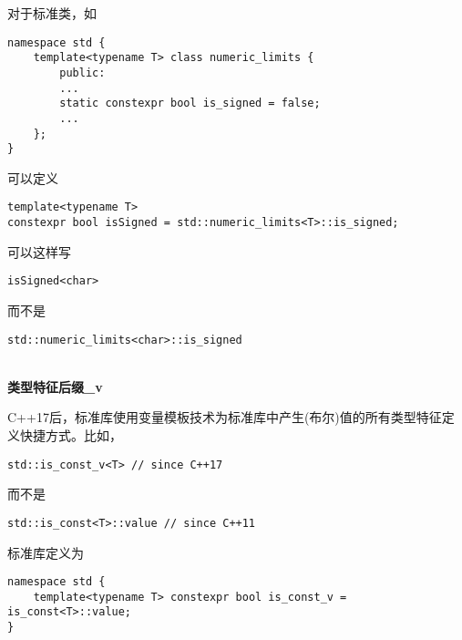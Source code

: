 对于标准类，如

\begin{lstlisting}[style=styleCXX]
namespace std {
	template<typename T> class numeric_limits {
		public:
		...
		static constexpr bool is_signed = false;
		...
	};
}
\end{lstlisting}

可以定义

\begin{lstlisting}[style=styleCXX]
template<typename T>
constexpr bool isSigned = std::numeric_limits<T>::is_signed;
\end{lstlisting}

可以这样写

\begin{lstlisting}[style=styleCXX]
isSigned<char>
\end{lstlisting}

而不是

\begin{lstlisting}[style=styleCXX]
std::numeric_limits<char>::is_signed
\end{lstlisting}

\hspace*{\fill} \\ %
\noindent
\textbf{类型特征后缀\_v}

C++17后，标准库使用变量模板技术为标准库中产生(布尔)值的所有类型特征定义快捷方式。比如，

\begin{lstlisting}[style=styleCXX]
std::is_const_v<T> // since C++17
\end{lstlisting}

而不是

\begin{lstlisting}[style=styleCXX]
std::is_const<T>::value // since C++11
\end{lstlisting}

标准库定义为

\begin{lstlisting}[style=styleCXX]
namespace std {
	template<typename T> constexpr bool is_const_v = is_const<T>::value;
}
\end{lstlisting}






















